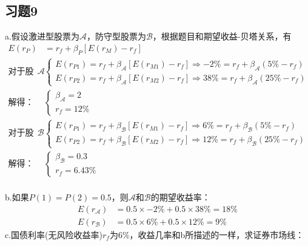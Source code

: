 \documentclass{article}
\begin{document}
\subsection*{习题9}
a.假设激进型股票为$\mathcal{A} $，防守型股票为$\mathcal{B} $，根据题目和期望收益-贝塔关系，有
\begin{align}
    E(r_P)&=r_f+\beta_P[E(r_M)-r_f]\\
    \text{对于股票}\mathcal{A} &
    \begin{cases}
        E(r_{P1})=r_f+\beta_\mathcal{A} [E(r_{M1})-r_f]\Rightarrow -2\%=r_f+\beta_\mathcal{A} (5\%-r_f)\\
        E(r_{P2})=r_f+\beta_\mathcal{A} [E(r_{M2})-r_f]\Rightarrow 38\%=r_f+\beta_\mathcal{A} (25\%-r_f)
    \end{cases}\\
    \text{解得：}&
    \begin{cases}
        \beta_\mathcal{A} =2\\
        r_f=12\%
    \end{cases}\\
    \hline
    \text{对于股票}\mathcal{B} &
    \begin{cases}
        E(r_{P1})=r_f+\beta_\mathcal{B} [E(r_{M1})-r_f]\Rightarrow 6\%=r_f+\beta_\mathcal{B} (5\%-r_f)\\
        E(r_{P2})=r_f+\beta_\mathcal{B} [E(r_{M2})-r_f]\Rightarrow 12\%=r_f+\beta_\mathcal{B} (25\%-r_f)
    \end{cases}\\
    \text{解得：}&
    \begin{cases}
        \beta_\mathcal{B} =0.3\\
        r_f=6.43\%
    \end{cases}\\
\end{align}

b.如果$P(1 )=P(2)=0.5$，则$\mathcal{A} $和$\mathcal{B} $的期望收益率：
\begin{align}
    E(r_\mathcal{A} )&=0.5\times -2\%+0.5\times 38\%=18\%\\
    E(r_\mathcal{B} )&=0.5\times 6\%+0.5\times 12\%=9\%
\end{align}
\clearpage
c.国债利率(无风险收益率)$r_f$为6\%，收益几率和b所描述的一样，求证券市场线：
\end{document}
